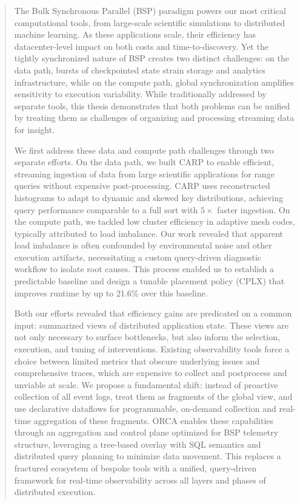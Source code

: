 \begin{abstract}
  The Bulk Synchronous Parallel (BSP) paradigm powers our most critical computational tools, from
  large-scale scientific simulations to distributed machine learning.
  As these applications scale, their efficiency has datacenter-level impact on both costs and
  time-to-discovery.
  Yet the tightly synchronized nature of BSP creates two distinct challenges: on the data path,
  bursts of checkpointed state strain storage and analytics infrastructure, while on the compute
  path, global synchronization amplifies sensitivity to execution variability.
  While traditionally addressed by separate tools, this thesis demonstrates that both problems can be
  unified by treating them as challenges of organizing and processing streaming data for insight.

  We first address these data and compute path challenges through two separate efforts.
  On the data path, we built CARP to enable efficient, streaming ingestion of data from large
  scientific applications for range queries without expensive post-processing.
  CARP uses reconstructed histograms to adapt to dynamic and skewed key distributions, achieving
  query performance comparable to a full sort with $5\times$ faster ingestion.
  On the compute path, we tackled low cluster efficiency in adaptive mesh codes, typically attributed
  to load imbalance.
  Our work revealed that apparent load imbalance is often confounded by environmental noise and other
  execution artifacts, necessitating a custom query-driven diagnostic workflow to isolate root
  causes.
  This process enabled us to establish a predictable baseline and design a tunable placement policy
  (CPLX) that improves runtime by up to 21.6\% over this baseline.

  Both our efforts revealed that efficiency gains are predicated on a common input: summarized views
  of distributed application state.
  These views are not only necessary to surface bottlenecks, but also inform the selection, execution,
  and tuning of interventions.
  Existing observability tools force a choice between limited metrics that obscure underlying issues
  and comprehensive traces, which are expensive to collect and postprocess and unviable at scale.
  We propose a fundamental shift: instead of proactive collection of all event logs, treat them as
  fragments of the global view, and use declarative dataflows for programmable, on-demand collection
  and real-time aggregation of these fragments.
  ORCA enables these capabilities through an aggregation and control plane optimized for BSP
  telemetry structure, leveraging a tree-based overlay with SQL semantics and distributed query
  planning to minimize data movement.
  This replaces a fractured ecosystem of bespoke tools with a unified, query-driven framework for
  real-time observability across all layers and phases of distributed execution.

\end{abstract}
\newpage
